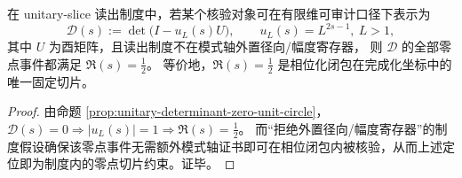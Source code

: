\begin{theorem}\label{thm:phase-lift-fixed-slice}
在 unitary-slice 读出制度中，若某个核验对象可在有限维可审计口径下表示为
\[
\mathcal{D}(s):=\det\!\bigl(I-u_L(s)U\bigr),
\qquad
u_L(s)=L^{2s-1},\ L>1,
\]
其中 \(U\) 为酉矩阵，且读出制度不在模式轴外置径向/幅度寄存器，
则 \(\mathcal{D}\) 的全部零点事件都满足 \(\Re(s)=\tfrac12\)。
等价地，\(\Re(s)=\tfrac12\) 是相位化闭包在完成化坐标中的唯一固定切片。
\end{theorem}
\begin{proof}
由命题 \ref{prop:unitary-determinant-zero-unit-circle}，\(\mathcal{D}(s)=0\Rightarrow |u_L(s)|=1\Rightarrow \Re(s)=\tfrac12\)。
而“拒绝外置径向/幅度寄存器”的制度假设确保该零点事件无需额外模式轴证书即可在相位闭包内被核验，从而上述定位即为制度内的零点切片约束。证毕。
\end{proof}

